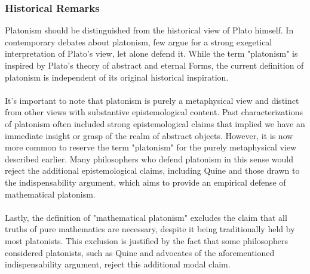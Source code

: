 \documentclass[10pt,a4paper]{article}
\newcounter{theo}
\begin{document}
                    \subsubsection{Historical Remarks}
                        Platonism should be distinguished from the historical view of Plato himself. In contemporary debates about platonism, few argue for a strong exegetical interpretation of Plato's view, let alone defend it. While the term "platonism" is inspired by Plato's theory of abstract and eternal Forms, the current definition of platonism is independent of its original historical inspiration.\cite{sep-platonism-mathematics}
                        \\
                        \\
                        It's important to note that platonism is purely a metaphysical view and distinct from other views with substantive epistemological content. Past characterizations of platonism often included strong epistemological claims that implied we have an immediate insight or grasp of the realm of abstract objects. However, it is now more common to reserve the term "platonism" for the purely metaphysical view described earlier. Many philosophers who defend platonism in this sense would reject the additional epistemological claims, including Quine and those drawn to the indispensability argument, which aims to provide an empirical defense of mathematical platonism.
                        \\
                        \\
                        Lastly, the definition of "mathematical platonism" excludes the claim that all truths of pure mathematics are necessary, despite it being traditionally held by most platonists. This exclusion is justified by the fact that some philosophers considered platonists, such as Quine and advocates of the aforementioned indispensability argument, reject this additional modal claim.
\end{document}
